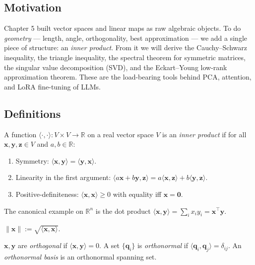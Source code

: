 \subsection*{Motivation}

Chapter 5 built vector spaces and linear maps as raw algebraic objects. To do \emph{geometry} --- length, angle, orthogonality, best approximation --- we add a single piece of structure: an \emph{inner product}. From it we will derive the Cauchy--Schwarz inequality, the triangle inequality, the spectral theorem for symmetric matrices, the singular value decomposition (SVD), and the Eckart--Young low-rank approximation theorem. These are the load-bearing tools behind PCA, attention, and LoRA fine-tuning of LLMs.

\subsection*{Definitions}

\begin{definition}
A function $\langle\cdot,\cdot\rangle:V\times V\to\mathbb{R}$ on a real vector space $V$ is an \emph{inner product} if for all $\mathbf{x},\mathbf{y},\mathbf{z}\in V$ and $a,b\in\mathbb{R}$:
\begin{enumerate}
  \item Symmetry: $\langle\mathbf{x},\mathbf{y}\rangle=\langle\mathbf{y},\mathbf{x}\rangle$.
  \item Linearity in the first argument: $\langle a\mathbf{x}+b\mathbf{y},\mathbf{z}\rangle=a\langle\mathbf{x},\mathbf{z}\rangle+b\langle\mathbf{y},\mathbf{z}\rangle$.
  \item Positive-definiteness: $\langle\mathbf{x},\mathbf{x}\rangle\ge 0$ with equality iff $\mathbf{x}=\mathbf{0}$.
\end{enumerate}
The canonical example on $\mathbb{R}^n$ is the dot product $\langle\mathbf{x},\mathbf{y}\rangle=\sum_i x_i y_i=\mathbf{x}^\top\mathbf{y}$.
\end{definition}

\begin{definition}
$\|\mathbf{x}\|:=\sqrt{\langle\mathbf{x},\mathbf{x}\rangle}$.
\end{definition}

\begin{definition}[Orthogonality]
$\mathbf{x},\mathbf{y}$ are \emph{orthogonal} if $\langle\mathbf{x},\mathbf{y}\rangle=0$. A set $\{\mathbf{q}_i\}$ is \emph{orthonormal} if $\langle\mathbf{q}_i,\mathbf{q}_j\rangle=\delta_{ij}$. An \emph{orthonormal basis} is an orthonormal spanning set.
\end{definition}

